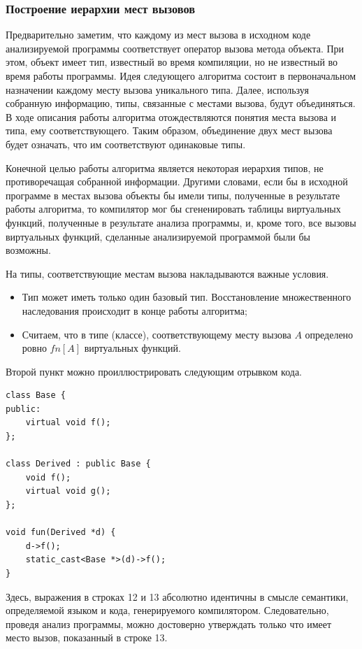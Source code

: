 \documentclass[a4paper,12pt,russian]{article}
\newcommand{\code}[1]{\textsf{#1}}
\begin{document}
\subsubsection{Построение иерархии мест вызовов}
Предварительно заметим, что каждому из мест вызова в исходном коде анализируемой программы соответствует оператор вызова метода объекта.
При этом, объект имеет тип, известный во время компиляции, но не известный во время работы программы.
Идея следующего алгоритма состоит в первоначальном назначении каждому месту вызова уникального типа.
Далее, используя собранную информацию, типы, связанные с местами вызова, будут объединяться.
В ходе описания работы алгоритма отождествляются понятия места вызова и типа, ему соответствующего.
Таким образом, объединение двух мест вызова будет означать, что им соответствуют одинаковые типы.

Конечной целью работы алгоритма является некоторая иерархия типов, не противоречащая собранной информации.
Другими словами, если бы в исходной программе в местах вызова объекты бы имели типы, полученные в результате работы алгоритма,
то компилятор мог бы сгененировать таблицы виртуальных функций, полученные в результате анализа программы, и, кроме того, все вызовы виртуальных функций,
сделанные анализируемой программой были бы возможны.

На типы, соответствующие местам вызова накладываются важные условия.
\begin{itemize}
\item Тип может иметь только один базовый тип. Восстановление множественного наследования происходит в конце работы алгоритма;
\item Считаем, что в типе (классе), соответствующему месту вызова $A$ определено ровно $fn[A]$ виртуальных функций.
\end{itemize}
Второй пункт можно проиллюстрировать следующим отрывком кода.
\begin{lstlisting}
class Base {
public:
    virtual void f();
};

class Derived : public Base {
    void f();
    virtual void g();
};

void fun(Derived *d) {
    d->f();
    static_cast<Base *>(d)->f();
}
\end{lstlisting}

Здесь, выражения в строках \code{12} и \code{13} абсолютно идентичны в смысле семантики, определяемой языком и кода, генерируемого компилятором.
Следовательно, проведя анализ программы, можно достоверно утверждать только что имеет место вызов, показанный в строке \code{13}.
\end{document}
